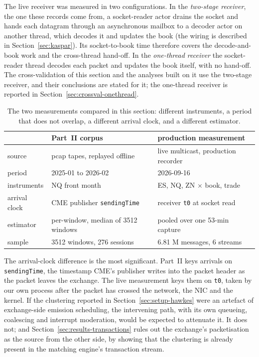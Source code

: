 \documentclass[11pt]{article}
\begin{document}
The live receiver was measured in two configurations. In the \emph{two-stage receiver}, the
one these records come from, a socket-reader actor drains the socket and hands each
datagram through an asynchronous mailbox to a decoder actor on another thread, which
decodes it and updates the book (the wiring is described in Section~\ref{sec:kaspar}). Its
socket-to-book time therefore covers the decode-and-book work and the cross-thread
hand-off. In the \emph{one-thread receiver} the socket-reader thread decodes each packet and
updates the book itself, with no hand-off. The cross-validation of this section and the
analyses built on it use the two-stage receiver, and their conclusions are stated for it;
the one-thread receiver is reported in Section~\ref{sec:crossval-onethread}.

\begin{table}[H]
\centering
\small
\begin{tabular}{@{}lll@{}}
\toprule
 & Part~II corpus & production measurement \\
\midrule
source        & pcap tapes, replayed offline  & live multicast, production recorder \\
period        & 2025-01 to 2026-02            & 2026-09-16 \\
instruments   & NQ front month                & ES, NQ, ZN $\times$ book, trade \\
arrival clock & CME publisher \texttt{sendingTime} & receiver \texttt{t0} at socket read \\
estimator     & per-window, median of 3512 windows & pooled over one 53-min capture \\
sample        & 3512 windows, 276 sessions    & 6.81 M messages, 6 streams \\
\bottomrule
\end{tabular}
\caption{The two measurements compared in this section: different instruments, a period
that does not overlap, a different arrival clock, and a different estimator.}
\label{tab:crossval-setup}
\end{table}

The arrival-clock difference is the most significant. Part~II keys arrivals on
\texttt{sendingTime}, the timestamp CME's publisher writes into the packet header as the
packet leaves the exchange. The live measurement keys them on \texttt{t0}, taken by our
own process after the packet has crossed the network, the NIC and the kernel. If the
clustering reported in Section~\ref{sec:setup-hawkes} were an artefact of exchange-side
emission scheduling, the intervening path, with its own queueing, coalescing and
interrupt moderation, would be expected to attenuate it. It does not; and
Section~\ref{sec:results-transactions} rules out the exchange's packetisation as the
source from the other side, by showing that the clustering is already present in the
matching engine's transaction stream.
\end{document}
